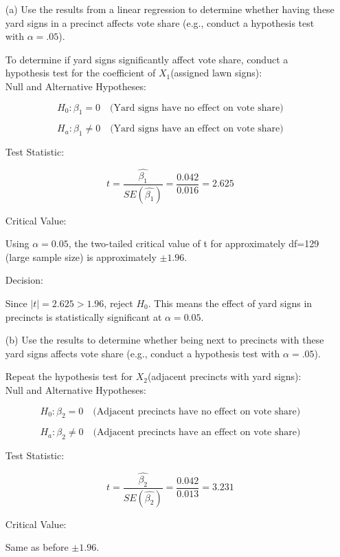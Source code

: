 \documentclass[12pt,letterpaper]{article}
\begin{document}
\vspace{.5cm}
\begin{enumerate}
	\item [(a)] Use the results from a linear regression to determine whether having these yard signs in a precinct affects vote share (e.g., conduct a hypothesis test with $\alpha = .05$).
	
	To determine if yard signs significantly affect vote share, conduct a hypothesis test for the coefficient of $X_1$(assigned lawn signs):\\
	
	Null and Alternative Hypotheses:
	
$$	H_0: \beta_1 = 0 \quad \text{(Yard signs have no effect on vote share)}$$

$$H_a: \beta_1 \neq 0 \quad \text{(Yard signs have an effect on vote share)}$$
	
	Test Statistic:
	
$$	t=\frac{\hat{\beta_1} }{SE(\hat{\beta_1} )}=\frac{0.042}{0.016}=2.625$$
	
	Critical Value:
	
	Using $ \alpha = 0.05$, the two-tailed critical value of t for approximately df=129 (large sample size) is approximately $\pm 1.96$.
	
	Decision:
	
	Since $|t|=2.625>1.96$, reject $H_0$. This means the effect of yard signs in precincts is statistically significant at $\alpha = 0.05$.
	
	
	\newpage		
	\item [(b)]  Use the results to determine whether being
	next to precincts with these yard signs affects vote
	share (e.g., conduct a hypothesis test with $\alpha = .05$).
	
	Repeat the hypothesis test for $X_2$(adjacent precincts with yard signs):\\
	
	Null and Alternative Hypotheses:
	
	$$	H_0: \beta_2 = 0 \quad \text{(Adjacent precincts have no effect on vote share)}$$
	
	$$H_a: \beta_2 \neq 0 \quad \text{(Adjacent precincts have an effect on vote share)}$$
	
	Test Statistic:
	
	$$	t=\frac{\hat{\beta_2} }{SE(\hat{\beta_2} )}=\frac{0.042}{0.013}=3.231$$
	
	Critical Value:
	
	Same as before $\pm 1.96$.
	

\end{enumerate}
\end{document}
